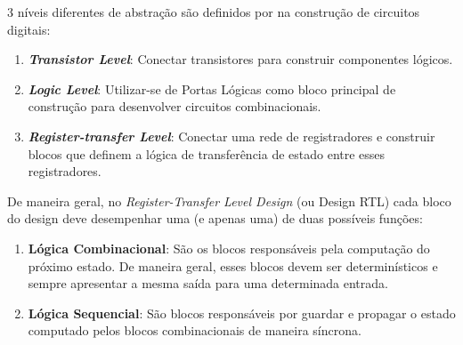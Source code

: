 \documentclass[
	12pt,				  %
	openright,		%
	a4paper,			%
	english,			%
	french,				%
	spanish,			%
	brazil,				%
]{abntex2}
\begin{document}
3 níveis diferentes de abstração são definidos por  na
construção de circuitos digitais:
\begin{enumerate}
	\item \textbf{\emph{Transistor Level}}: Conectar transistores para construir
	      componentes lógicos.
	\item \textbf{\emph{Logic Level}}: Utilizar-se de Portas Lógicas como bloco
	      principal de construção para desenvolver circuitos combinacionais.
	\item \textbf{\emph{Register-transfer Level}}: Conectar uma rede de
	      registradores e construir blocos que definem a lógica de transferência de
	      estado entre esses registradores.
\end{enumerate}

De maneira geral, no \emph{Register-Transfer Level Design} (ou Design RTL) cada
bloco do design deve desempenhar uma (e apenas uma) de duas possíveis funções:
\begin{enumerate}
	\item \textbf{Lógica Combinacional}: São os blocos responsáveis pela
	      computação do próximo estado. De maneira geral, esses blocos devem ser
	      determinísticos e sempre apresentar a mesma saída para uma determinada
	      entrada.
	\item \textbf{Lógica Sequencial}: São blocos responsáveis por guardar e
	      propagar o estado computado pelos blocos combinacionais de maneira
	      síncrona.
\end{enumerate}
\end{document}
